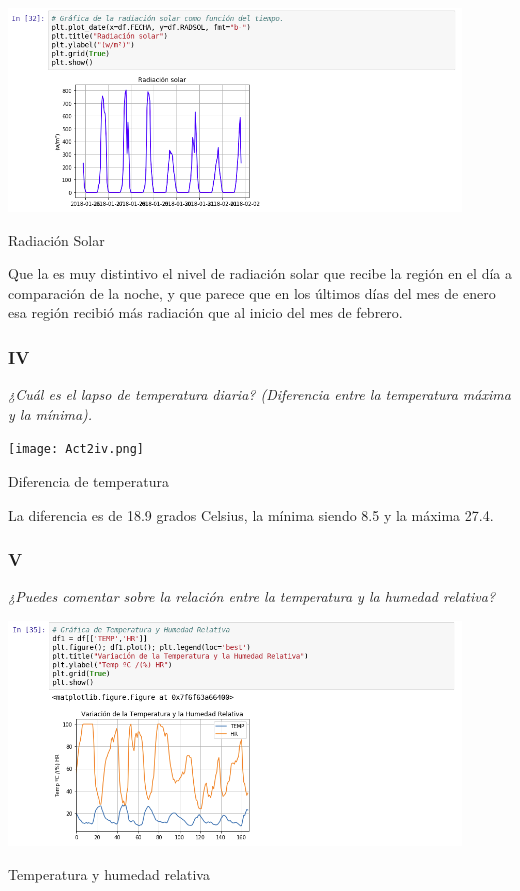 \documentclass{article}
\begin{document}
\begin{center}
	\includegraphics[width=12cm]{Act2iii.png}
    
    Radiación Solar
\end{center}
\vspace{0.3cm}

Que la es muy distintivo el nivel de radiación solar que recibe la región en el día a comparación de la noche, y que parece que en los últimos días del mes de enero esa región recibió más radiación que al inicio del mes de febrero.

\subsubsection{IV}
\textit{¿Cuál es el lapso de temperatura diaria? (Diferencia entre la temperatura máxima y la mínima).} 

\begin{center}
	\texttt{[image: Act2iv.png]}
    
    Diferencia de temperatura
\end{center}
\vspace{0.3cm}

La diferencia es de 18.9 grados Celsius, la mínima siendo 8.5 y la máxima 27.4. 

\subsubsection{V}
\textit{¿Puedes comentar sobre la relación entre la temperatura y la humedad relativa?}

\begin{center}
	\includegraphics[width=12cm]{Act2v.png}
    
    Temperatura y humedad relativa
\end{center}
\vspace{0.3cm}
\end{document}
